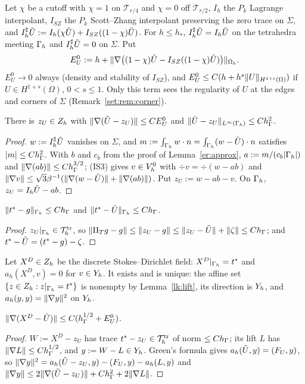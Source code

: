 Let $\chi$ be a cutoff with $\chi=1$ on $\mathcal T_{r/4}$ and $\chi=0$ off $\mathcal T_{r/2}$, $I_h$ the $P_k$ Lagrange interpolant, $I_{SZ}$ the $P_k$ Scott--Zhang interpolant preserving the zero trace on $\Sigma$, and $I_h^\sharp\tilde U:=I_h(\chi\tilde U)+I_{SZ}((1-\chi)\tilde U)$. For $h\le h_\ast$, $I_h^\sharp\tilde U=I_h\tilde U$ on the tetrahedra meeting $\Gamma_h$ and $I_h^\sharp\tilde U=0$ on $\Sigma$. Put
\[
E^0_U:=h+\lVert \nabla\bigl((1-\chi)\tilde U-I_{SZ}((1-\chi)\tilde U)\bigr)\rVert_{\Omega_h}.
\]
$E^0_U\to0$ always (density and stability of $I_{SZ}$), and $E^0_U\le C(h+h^s\lVert U\rVert_{H^{1+s}(\Omega)})$ if $U\in H^{1+s}(\Omega)$, $0<s\le1$. Only this term sees the regularity of $U$ at the edges and corners of $\Sigma$ (Remark~\ref{set:rem:corner}).

\begin{lemma}\label{lk:zU}
There is $z_U\in Z_h$ with $\lVert \nabla(\tilde U-z_U)\rVert\le CE^0_U$ and $\lVert \tilde U-z_U\rVert_{L^\infty(\Gamma_h)}\le Ch_\Gamma^2$.
\end{lemma}
\begin{proof}
$w:=I^\sharp_h\tilde U$ vanishes on $\Sigma$, and $m:=\int_{\Gamma_h}w\cdot n=\int_{\Gamma_h}(w-\tilde U)\cdot n$ satisfies $|m|\le Ch_\Gamma^2$. With $b$ and $c_b$ from the proof of Lemma~\ref{er:approx}, $a:=m/(c_b|\Gamma_h|)$ and $\lVert \nabla(ab)\rVert\le Ch_\Gamma^{3/2}$; (IS3) gives $v\in V_h^0$ with $\div v=\div(w-ab)$ and $\lVert \nabla v\rVert\le\sqrt3\beta^{-1}(\lVert \nabla(w-\tilde U)\rVert+\lVert \nabla(ab)\rVert)$. Put $z_U:=w-ab-v$. On $\Gamma_h$, $z_U=I_h\tilde U-ab$.
\end{proof}

\begin{lemma}\label{lk:size}
$\lVert t^\ast-g\rVert_{\Gamma_h}\le Ch_\Gamma$ and $\lVert t^\ast-\tilde U\rVert_{\Gamma_h}\le Ch_\Gamma$.
\end{lemma}
\begin{proof}
$z_U|_{\Gamma_h}\in\mathcal T^{\rm tr}_h$, so $\lVert \Pi_Tg-g\rVert\le\lVert z_U-g\rVert\le\lVert z_U-\tilde U\rVert+\lVert \zeta\rVert\le Ch_\Gamma$; and $t^\ast-\tilde U=(t^\ast-g)-\zeta$.
\end{proof}

Let $X^D\in Z_h$ be the discrete Stokes--Dirichlet field: $X^D|_{\Gamma_h}=t^\ast$ and $a_h(X^D,v)=0$ for $v\in Y_h$. It exists and is unique: the affine set $\{z\in Z_h:z|_{\Gamma_h}=t^\ast\}$ is nonempty by Lemma~\ref{lk:lift}, its direction is $Y_h$, and $a_h(y,y)=\lVert \nabla y\rVert^2$ on $Y_h$.

\begin{lemma}\label{lk:XD}
$\lVert \nabla(X^D-\tilde U)\rVert\le C(h_\Gamma^{1/2}+E^0_U)$.
\end{lemma}
\begin{proof}
$W:=X^D-z_U$ has trace $t^\ast-z_U\in\mathcal T^{\rm tr}_h$ of norm $\le Ch_\Gamma$; its lift $L$ has $\lVert \nabla L\rVert\le Ch_\Gamma^{1/2}$, and $y:=W-L\in Y_h$. Green's formula gives $a_h(\tilde U,y)=(F_U,y)$, so $\lVert \nabla y\rVert^2=a_h(\tilde U-z_U,y)-(F_U,y)-a_h(L,y)$ and $\lVert \nabla y\rVert\le2\lVert \nabla(\tilde U-z_U)\rVert+Ch_\Gamma^2+2\lVert \nabla L\rVert$.
\end{proof}


